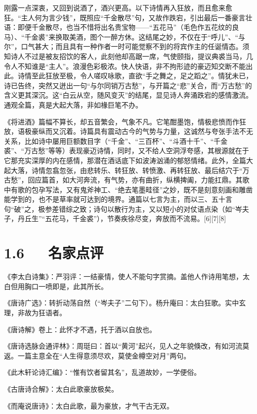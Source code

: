 \documentclass[letterpaper,10pt,english]{sphinxmanual}
\begin{document}
刚露一点深衷，又回到说酒了，酒兴更高。以下诗情再入狂放，而且愈来愈狂。“主人何为言少钱”，既照应“千金散尽”句，又故作跌宕，引出最后一番豪言壮语：即便千金散尽，也当不惜将出名贵宝物——“五花马”（毛色作五花纹的良马）、“千金裘”来换取美酒，图个一醉方休。这结尾之妙，不仅在于“呼儿”、“与尔”，口气甚大；而且具有一种作者一时可能觉察不到的将宾作主的任诞情态。须知诗人不过是被友招饮的客人，此刻他却高踞一席，气使颐指，提议典裘当马，几令人不知谁是“主人”。浪漫色彩极浓。快人快语，非不拘形迹的豪迈知交断不能出此。诗情至此狂放至极，令人嗟叹咏歌，直欲“手之舞之，足之蹈之”。情犹未已，诗已告终，突然又迸出一句“与尔同销万古愁”，与开篇之“悲”关合，而“万古愁”的含义更其深沉。这“白云从空，随风变灭”的结尾，显见诗人奔涌跌宕的感情激流。通观全篇，真是大起大落，非如椽巨笔不办。

《将进酒》篇幅不算长，却五音繁会，气象不凡。它笔酣墨饱，情极悲愤而作狂放，语极豪纵而又沉着。诗篇具有震动古今的气势与力量，这诚然与夸张手法不无关系，比如诗中屡用巨额数目字（“千金”、“三百杯”、“斗酒十千”、“千金裘”、“万古愁”等等）表现豪迈诗情，同时，又不给人空洞浮夸感，其根源就在于它那充实深厚的内在感情，那潜在酒话底下如波涛汹涌的郁怒情绪。此外，全篇大起大落，诗情忽翕忽张，由悲转乐、转狂放、转愤激、再转狂放、最后结穴于“万古愁”，回应篇首，如大河奔流，有气势，亦有曲折，纵横捭阖，力能扛鼎。其歌中有歌的包孕写法，又有鬼斧神工、“绝去笔墨畦径”之妙，既不是刻意刻画和雕凿能学到的，也不是草率就可达到的境界。通篇以七言为主，而以三、五十言句“破”之，极参差错综之致；诗句以散行为主，又以短小的对仗语点染（如“岑夫子，丹丘生”“五花马，千金裘”），节奏疾徐尽变，奔放而不流易。{[}6{]}{[}7{]}{[}8{]}


\section{1.6   名家点评}
\label{\detokenize{p01_u6563_u6587/_u674e_u767d-_u5c06_u8fdb_u9152:id8}}
《李太白诗集》：严羽评：一结豪情，使人不能句字赏摘。盖他人作诗用笔想，太白但用胸口一喷即是，此其所长。

《唐诗广选》：转折动荡自然（“岑夫子”二句下）。杨升庵曰：太白狂歌。实中玄理，非故为狂语者。

《唐诗解》卷上：此怀才不遇，托于酒以自放也。

《唐诗选脉会通评林》：周珽曰：首以“黄河”起兴，见人之年貌倏改，有如河流莫返。一篇主意全在“人生得意须尽欢，莫使金樽空对月”两句。

《此木轩论诗汇编》：“惟有饮者留其名”，乱道故妙，一学便俗。

《古唐诗合解》：太白此歌豪放极矣。

《而庵说唐诗》：太白此歌，最为豪放，才气干古无双。
\end{document}
